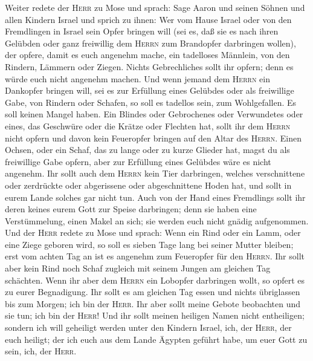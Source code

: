  Weiter redete der \textsc{Herr} zu Mose und sprach:
 Sage Aaron und seinen Söhnen und allen Kindern Israel
und sprich zu ihnen: Wer vom Hause Israel oder von den Fremdlingen in
Israel sein Opfer bringen will (sei es, daß sie es nach ihren Gelübden
oder ganz freiwillig dem \textsc{Herrn} zum Brandopfer darbringen
wollen),  der opfere, damit es euch angenehm mache, ein
tadelloses Männlein, von den Rindern, Lämmern oder Ziegen.
 Nichts Gebrechliches sollt ihr opfern; denn es würde
euch nicht angenehm machen.  Und wenn jemand dem
\textsc{Herrn} ein Dankopfer bringen will, sei es zur Erfüllung eines
Gelübdes oder als freiwillige Gabe, von Rindern oder Schafen, so soll es
tadellos sein, zum Wohlgefallen. Es soll keinen Mangel haben.
 Ein Blindes oder Gebrochenes oder Verwundetes oder
eines, das Geschwüre oder die Krätze oder Flechten hat, sollt ihr dem
\textsc{Herrn} nicht opfern und davon kein Feueropfer bringen auf den
Altar des \textsc{Herrn}.  Einen Ochsen, oder ein Schaf,
das zu lange oder zu kurze Glieder hat, magst du als freiwillige Gabe
opfern, aber zur Erfüllung eines Gelübdes wäre es nicht angenehm.
 Ihr sollt auch dem \textsc{Herrn} kein Tier darbringen,
welches verschnittene oder zerdrückte oder abgerissene oder
abgeschnittene Hoden hat, und sollt in eurem Lande solches gar nicht
tun.  Auch von der Hand eines Fremdlings sollt ihr deren
keines eurem Gott zur Speise darbringen; denn sie haben eine
Verstümmelung, einen Makel an sich; sie werden euch nicht gnädig
aufgenommen.  Und der \textsc{Herr} redete zu Mose und
sprach:  Wenn ein Rind oder ein Lamm, oder eine Ziege
geboren wird, so soll es sieben Tage lang bei seiner Mutter bleiben;
erst vom achten Tag an ist es angenehm zum Feueropfer für den
\textsc{Herrn}.  Ihr sollt aber kein Rind noch Schaf
zugleich mit seinem Jungen am gleichen Tag schächten. 
Wenn ihr aber dem \textsc{Herrn} ein Lobopfer darbringen wollt, so
opfert es zu eurer Begnadigung.  Ihr sollt es am gleichen
Tag essen und nichts übriglassen bis zum Morgen; ich bin der
\textsc{Herr}.  Ihr aber sollt meine Gebote beobachten
und sie tun; ich bin der \textsc{Herr}!  Und ihr sollt
meinen heiligen Namen nicht entheiligen; sondern ich will geheiligt
werden unter den Kindern Israel, ich, der \textsc{Herr}, der euch
heiligt;  der ich euch aus dem Lande Ägypten geführt
habe, um euer Gott zu sein, ich, der \textsc{Herr}.

